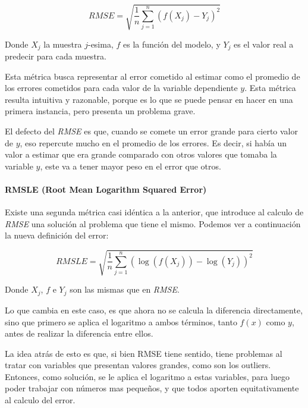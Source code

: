         \[ RMSE= \sqrt{\frac{1}{n}\sum_{j=1}^{n} (f(X_j) - Y_j)^2}\]
        
        Donde $X_j$ la muestra $j$-esima, $f$ es la función del modelo, y $Y_j$ es el valor real a predecir para cada muestra.
        
        Esta métrica busca representar al error cometido al estimar como el promedio de los errores cometidos para cada valor de la variable dependiente $y$. Esta métrica resulta intuitiva y razonable, porque es  lo que se puede pensar en hacer en una primera instancia, pero presenta un problema grave.
        
        
        El defecto del \emph{RMSE} es que, cuando se comete un error grande para cierto valor de $y$, eso repercute mucho en el promedio de los errores. Es decir, si había un valor a estimar que era grande comparado con otros valores que tomaba la variable $y$, este va a tener mayor peso en el error que otros.
        
        \paragraph{RMSLE (Root Mean Logarithm Squared Error)}\mbox{}\vspace{1em}
        
        Existe una segunda métrica casi idéntica a la anterior, que introduce al calculo de \emph{RMSE} una solución al problema que tiene el mismo. Podemos ver a continuación la nueva definición del error:
        
        \[ RMSLE= \sqrt{\frac{1}{n}\sum_{j=1}^{n} (\log{(f(X_j))} - \log{(Y_j)})^2}\]
        
        Donde $X_j$, $f$ e $Y_j$ son las mismas que en \emph{RMSE}.
        
        Lo que cambia en este caso, es que ahora no se calcula la diferencia directamente, sino que primero se aplica el logaritmo a ambos términos, tanto $f(x)$ como $y$, antes de realizar la diferencia entre ellos.
        
        La idea atrás de esto es que, si bien RMSE tiene sentido, tiene problemas al tratar con variables que presentan valores grandes, como son los outliers. Entonces, como solución, se le aplica el logaritmo a estas variables, para luego poder trabajar con números mas pequeños, y que todos aporten equitativamente al calculo del error.
        
